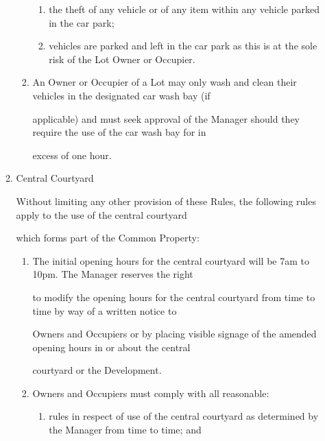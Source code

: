 \documentclass{article}
\begin{document}
\begin{enumerate}[label=\arabic*.]
\begin{enumerate}[label=\arabic{enumi}.\arabic*.]
\begin{enumerate}[label=(\arabic*)]
\begin{enumerate}[label=(\alph*)]
\item {\fontsize{9.962}{1} the theft of any vehicle or of any item within any vehicle parked in the car park; }

\item {\fontsize{9.962}{1} vehicles are parked and left in the car park as this is at the sole risk of the Lot Owner or Occupier. }

\end{enumerate}
\item {\fontsize{9.962}{1} An Owner or Occupier of a Lot may only wash and clean their vehicles in the designated car wash bay (if }

{\fontsize{10.02}{1}applicable) and must seek approval of the Manager should they require the use of the car wash bay for in }

{\fontsize{10.02}{1}excess of one hour. }

\end{enumerate}
\item {\fontsize{9.99}{1} Central Courtyard }

{\fontsize{10.02}{1}Without limiting any other provision of these Rules, the following rules apply to the use of the central courtyard }

{\fontsize{10.02}{1}which forms part of the Common Property: }

\begin{enumerate}[label=(\arabic*)]
\item {\fontsize{9.962}{1} The initial opening hours for the central courtyard will be 7am to 10pm. The Manager reserves the right }

{\fontsize{10.02}{1}to modify the opening hours for the central courtyard from time to time by way of a written notice to }

{\fontsize{10.02}{1}Owners and Occupiers or by placing visible signage of the amended opening hours in or about the central }

{\fontsize{10.02}{1}courtyard or the Development.  }

\newpage

\item {\fontsize{9.962}{1} Owners and Occupiers must comply with all reasonable: }

\begin{enumerate}[label=(\alph*)]
\item {\fontsize{9.962}{1} rules in respect of use of the central courtyard as determined by the Manager from time to time; and }


\end{enumerate}
\end{enumerate}
\end{enumerate}
\end{enumerate}
\end{document}
